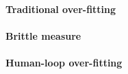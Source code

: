 \documentclass[a4paper, 11pt]{article}
\begin{document}
\paragraph{Traditional over-fitting} %
\label{par:traditional_over_fitting}


\paragraph{Brittle measure} %
\label{par:brittle_measure}


\paragraph{Human-loop over-fitting} %
\label{par:human_loop_over_fitting}


\end{document}
